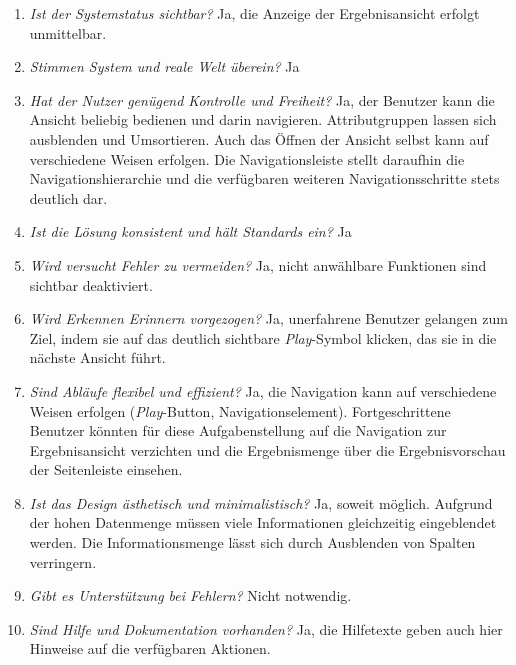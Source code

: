 \begin{enumerate}
 \item \textit{Ist der Systemstatus sichtbar?} Ja, die Anzeige der Ergebnisansicht erfolgt unmittelbar.
 \item \textit{Stimmen System und reale Welt überein?} Ja
 \item \textit{Hat der Nutzer genügend Kontrolle und Freiheit?} Ja, der Benutzer kann die Ansicht beliebig bedienen und darin navigieren. Attributgruppen lassen sich ausblenden und Umsortieren. Auch das Öffnen der Ansicht selbst kann auf verschiedene Weisen erfolgen. Die Navigationsleiste stellt daraufhin die Navigationshierarchie und die verfügbaren weiteren Navigationsschritte stets deutlich dar.
 \item \textit{Ist die Lösung konsistent und hält Standards ein?} Ja
 \item \textit{Wird versucht Fehler zu vermeiden?} Ja, nicht anwählbare Funktionen sind sichtbar deaktiviert.
 \item \textit{Wird Erkennen Erinnern vorgezogen?} Ja, unerfahrene Benutzer gelangen zum Ziel, indem sie auf das deutlich sichtbare \textit{Play}-Symbol klicken, das sie in die nächste Ansicht führt.
 \item \textit{Sind Abläufe flexibel und effizient?} Ja, die Navigation kann auf verschiedene Weisen erfolgen (\textit{Play}-Button, Navigationselement). Fortgeschrittene Benutzer könnten für diese Aufgabenstellung auf die Navigation zur Ergebnisansicht verzichten und die Ergebnismenge über die Ergebnisvorschau der Seitenleiste einsehen.
 \item \textit{Ist das Design ästhetisch und minimalistisch?} Ja, soweit möglich. Aufgrund der hohen Datenmenge müssen viele Informationen gleichzeitig eingeblendet werden. Die Informationsmenge lässt sich durch Ausblenden von Spalten verringern.
 \item \textit{Gibt es Unterstützung bei Fehlern?} Nicht notwendig.
 \item \textit{Sind Hilfe und Dokumentation vorhanden?} Ja, die Hilfetexte geben auch hier Hinweise auf die verfügbaren Aktionen.
\end{enumerate}

